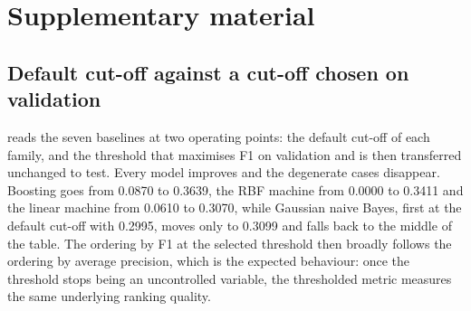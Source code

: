 %

\appendix

\section{Supplementary material}
\label{sec:appendix}

\subsection{Default cut-off against a cut-off chosen on validation}
\label{sec:appendix-operating}

 reads the seven baselines at two operating points: the
default cut-off of each family, and the threshold that maximises F1 on
validation and is then transferred unchanged to test. Every model improves and
the degenerate cases disappear. Boosting goes from \num{0.0870} to \num{0.3639},
the RBF machine from \num{0.0000} to \num{0.3411} and the linear machine from
\num{0.0610} to \num{0.3070}, while Gaussian naive Bayes, first at the default
cut-off with \num{0.2995}, moves only to \num{0.3099} and falls back to the
middle of the table. The ordering by F1 at the selected threshold then broadly
follows the ordering by average precision, which is the expected behaviour: once
the threshold stops being an uncontrolled variable, the thresholded metric
measures the same underlying ranking quality.

\begin{table}[t]
  \centering
  \caption{Test precision, recall and F1 at the default cut-off of each family
  (\num{0.5} on a posterior, \num{0} on a margin) and at the cut-off that
  maximises validation F1. The test split is never used to choose the threshold.
  The two models that made almost no positive call at the default cut-off gain
  the most.}
  \label{tab:operating}
  \footnotesize\setlength{\tabcolsep}{4pt}
  
\end{table}

